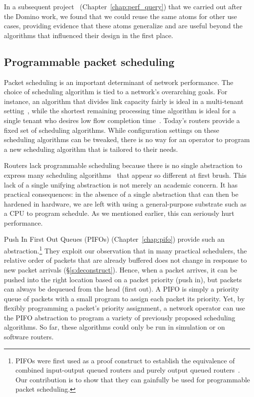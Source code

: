 In a subsequent project~\cite{perf_query} (Chapter~\ref{chap:perf_query}) that we carried out after
the Domino work, we found that we could reuse the same atoms for other use
cases, providing evidence that these atoms generalize and are useful beyond the
algorithms that influenced their design in the first place.

\subsection{Programmable packet scheduling}
Packet scheduling is an important determinant of network performance. The
choice of scheduling algorithm is tied to a network's overarching goals. For
instance, an algorithm that divides link capacity fairly is ideal in a
multi-tenant setting~\cite{wfq}, while the shortest remaining processing time
algorithm is ideal for a single tenant who desires low flow completion
time~\cite{pFabric}. Today's routers provide a fixed set of scheduling
algorithms. While configuration settings on these scheduling algorithms can be
tweaked, there is no way for an operator to program a new scheduling algorithm
that is tailored to their needs.

Routers lack programmable scheduling because there is no single abstraction to
express many scheduling algorithms~\cite{wfq, srpt, srr, pFabric, lstf}
that appear so different at first brush. This lack of a single unifying
abstraction is not merely an academic concern. It has practical consequences:
in the absence of a single abstraction that can then be hardened in hardware,
we are left with using a general-purpose substrate such as a CPU to program
schedule. As we mentioned earlier, this can seriously hurt performance.

 Push In First Out Queues (PIFOs) (Chapter~\ref{chap:pifo}) provide such an
abstraction.\footnote{PIFOs were first used as a proof construct to establish
the equivalence of combined input-output queued routers and purely output
queued routers~\cite{pifo}. Our contribution is to show that they can gainfully
be used for programmable packet scheduling.} They exploit our observation that
in many practical schedulers, the relative order of packets that are already
buffered does not change in response to new packet arrivals
(\S\ref{s:deconstruct}). Hence, when a packet arrives, it can be pushed into
the right location based on a packet priority (push in), but packets can always
be dequeued from the head (first out). A PIFO is simply a
priority queue of packets with a small program to assign each packet its
priority. Yet, by flexibly programming a packet's priority assignment, a
network operator can use the PIFO abstraction to program a variety of
previously proposed scheduling algorithms. So far, these algorithms could only
be run in simulation or on software routers.

